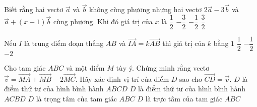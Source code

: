 \begin{ex}%
	Biết rằng hai vectơ $\overrightarrow a $ và $\overrightarrow b $ không cùng phương nhưng hai vectơ $2\overrightarrow a-3\overrightarrow b $ và $\overrightarrow a+(x-1)\overrightarrow b $ cùng phương. Khi đó giá trị của $ x $ là
	\choice
	{$\dfrac{1}{2}$}
	{$-\dfrac{3}{2}$}
	{\True $-\dfrac{1}{2}$}
	{$\dfrac{3}{2}$}
\end{ex}

\begin{ex}%
	Nếu $ I$ là trung điểm đoạn thẳng $ AB$ và $\overrightarrow{IA}=k\overrightarrow{AB}$ thì giá trị của $ k$ bằng
	\choice
	{$ 1$}
	{$\dfrac{1}{2}$}
	{\True $-\dfrac{1}{2}$}
	{$-2$}
\end{ex}

\begin{ex}%
	Cho tam giác $ ABC$ và một điểm $ M$ tùy ý. Chứng minh rằng vectơ $\overrightarrow v=\overrightarrow{MA}+\overrightarrow{MB}-2\overrightarrow{MC}$. Hãy xác định vị trí của điểm $ D$ sao cho $\overrightarrow{CD}=\overrightarrow v $.
	\choice
	{$ D$ là điểm thứ tư của hình bình hành $ ABCD$}
	{\True $ D$ là điểm thứ tư của hình bình hành $ ACBD$}
	{$ D$ là trọng tâm của tam giác $ ABC$}
	{$ D$ là trực tâm của tam giác $ ABC$}
\end{ex}


